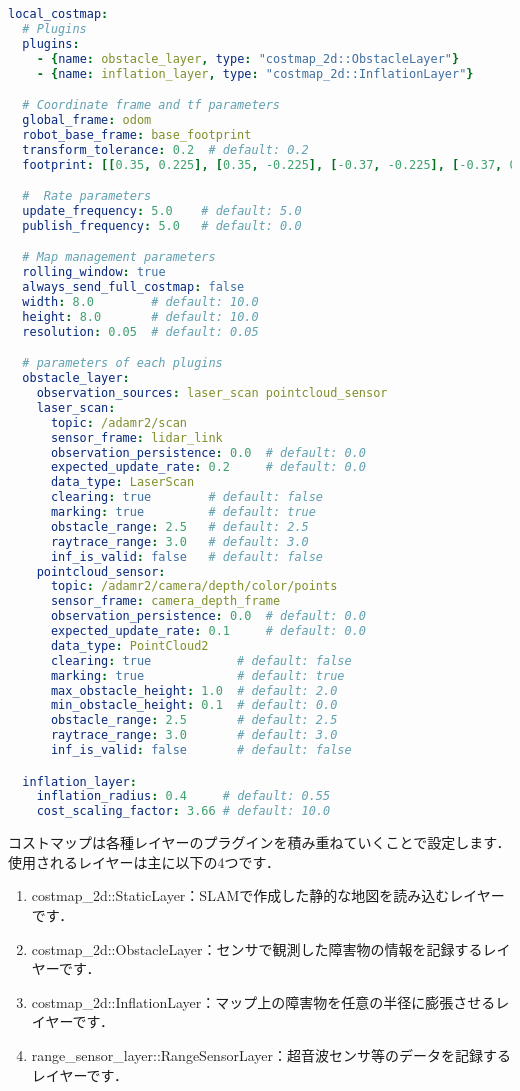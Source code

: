 \documentclass[{../../master}]{subfiles}
\begin{document}
\begin{lstlisting}[language=YAML, label=code:local_costmap_yml, caption=\textsf{local\_costmap.yml}]
local_costmap:
  # Plugins
  plugins:
    - {name: obstacle_layer, type: "costmap_2d::ObstacleLayer"}
    - {name: inflation_layer, type: "costmap_2d::InflationLayer"}

  # Coordinate frame and tf parameters
  global_frame: odom
  robot_base_frame: base_footprint
  transform_tolerance: 0.2  # default: 0.2
  footprint: [[0.35, 0.225], [0.35, -0.225], [-0.37, -0.225], [-0.37, 0.225]]

  #  Rate parameters
  update_frequency: 5.0    # default: 5.0
  publish_frequency: 5.0   # default: 0.0

  # Map management parameters
  rolling_window: true
  always_send_full_costmap: false
  width: 8.0        # default: 10.0
  height: 8.0       # default: 10.0
  resolution: 0.05  # default: 0.05

  # parameters of each plugins
  obstacle_layer:
    observation_sources: laser_scan pointcloud_sensor
    laser_scan:
      topic: /adamr2/scan
      sensor_frame: lidar_link
      observation_persistence: 0.0  # default: 0.0
      expected_update_rate: 0.2     # default: 0.0
      data_type: LaserScan
      clearing: true        # default: false
      marking: true         # default: true
      obstacle_range: 2.5   # default: 2.5
      raytrace_range: 3.0   # default: 3.0
      inf_is_valid: false   # default: false
    pointcloud_sensor:
      topic: /adamr2/camera/depth/color/points
      sensor_frame: camera_depth_frame
      observation_persistence: 0.0  # default: 0.0
      expected_update_rate: 0.1     # default: 0.0
      data_type: PointCloud2
      clearing: true            # default: false
      marking: true             # default: true
      max_obstacle_height: 1.0  # default: 2.0
      min_obstacle_height: 0.1  # default: 0.0
      obstacle_range: 2.5       # default: 2.5
      raytrace_range: 3.0       # default: 3.0
      inf_is_valid: false       # default: false

  inflation_layer:
    inflation_radius: 0.4     # default: 0.55
    cost_scaling_factor: 3.66 # default: 10.0
\end{lstlisting}

コストマップは各種レイヤーのプラグインを積み重ねていくことで設定します．
使用されるレイヤーは主に以下の4つです．

\begin{enumerate}
  \item \textsf{costmap\_2d::StaticLayer}：SLAMで作成した静的な地図を読み込むレイヤーです．
  \item \textsf{costmap\_2d::ObstacleLayer}：センサで観測した障害物の情報を記録するレイヤーです．
  \item \textsf{costmap\_2d::InflationLayer}：マップ上の障害物を任意の半径に膨張させるレイヤーです．
  \item \textsf{range\_sensor\_layer::RangeSensorLayer}：超音波センサ等のデータを記録するレイヤーです．
\end{enumerate}
\end{document}

